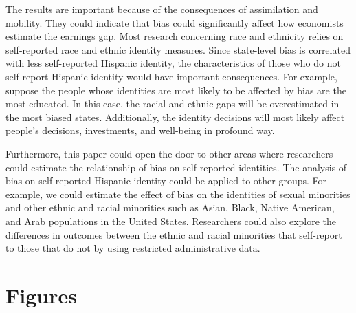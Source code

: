 \documentclass[12pt, fullpage]{article}
\begin{document}
The results are important because of the consequences of assimilation and mobility. They could indicate that bias could significantly affect how economists estimate the earnings gap. Most research concerning race and ethnicity relies on self-reported race and ethnic identity measures. Since state-level bias is correlated with less self-reported Hispanic identity, the characteristics of those who do not self-report Hispanic identity would have important consequences. For example, suppose the people whose identities are most likely to be affected by bias are the most educated. In this case, the racial and ethnic gaps will be overestimated in the most biased states. Additionally, the identity decisions will most likely affect people's decisions, investments, and well-being in profound way. 

Furthermore, this paper could open the door to other areas where researchers could estimate the relationship of bias on self-reported identities. The analysis of bias on self-reported Hispanic identity could be applied to other groups. For example, we could estimate the effect of bias on the identities of sexual minorities and other ethnic and racial minorities such as Asian, Black, Native American, and Arab populations in the United States. Researchers could also explore the differences in outcomes between the ethnic and racial minorities that self-report to those that do not by using restricted administrative data. 

\appendix

\section{Figures}
\end{document}
